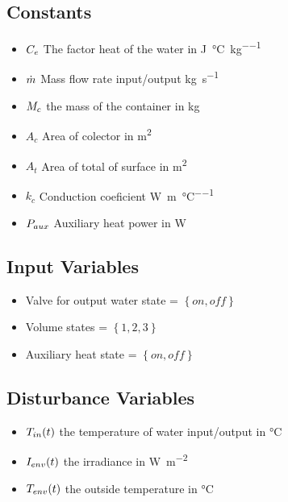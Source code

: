 \subsection{Constants}
\begin{itemize}
\item 
  $C_e$ The factor heat of the water in \si{\joule\per\degreeCelsius\per\kilogram}
\item
  $\dot{m}$ Mass flow rate input/output  \si{\kilogram\per\second}
\item
  $M_{c}$ the mass of the container in \si{\kilogram}
\item
  $A_c$ Area of colector in \si{\metre^2}
\item
  $A_t$ Area of total of surface in \si{\metre^2}
\item
  $k_c$ Conduction coeficient \si{\watt\per\metre\per\degreeCelsius}
\item
  $P_{aux}$ Auxiliary heat power in \si{\watt}

\end{itemize}

\subsection{Input Variables}
\begin{itemize}
\item
  Valve for output water state = $\left\lbrace on,off \right\rbrace $
\item
  Volume states = $\left\lbrace1,2,3\right\rbrace $
\item
  Auxiliary heat state = $\left\lbrace on,off \right\rbrace $


\end{itemize}

\subsection{Disturbance Variables}
\begin{itemize}
\item 
  $T_{in}(t)$ the temperature of water input/output in \si{\degreeCelsius}
\item
  $I_{env}(t)$ the irradiance in \si{\watt\per\square\metre}
\item
  $T_{env}(t)$ the outside temperature in \si{\degreeCelsius}
\end{itemize}

